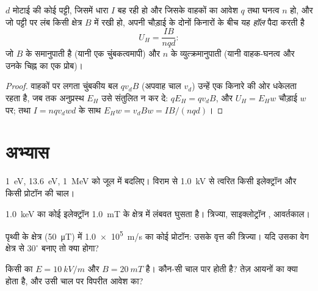 \begin{proposition}[हॉल प्रभाव]\label{prop:b1:charged-particles:hall}
$d$ मोटाई की कोई पट्टी, जिसमें धारा $I$ बह रही हो और जिसके वाहकों का आवेश
$q$ तथा घनत्व $n$ हो, और जो पट्टी पर लंब किसी क्षेत्र $B$ में रखी हो, अपनी
चौड़ाई के दोनों किनारों के बीच यह \emph{हॉल } पैदा करती है
\[
U_H = \frac{IB}{nqd} :
\]
जो $B$ के समानुपाती है (यानी एक चुंबकत्वमापी) और $n$ के व्युत्क्रमानुपाती
(यानी वाहक-घनत्व और उनके चिह्न का एक प्रोब)।
\end{proposition}

\begin{proof}
वाहकों पर लगता चुंबकीय बल $qv_dB$ (अपवाह चाल $v_d$) उन्हें एक किनारे की ओर
धकेलता रहता है, जब तक अनुप्रस्थ  $E_H$ उसे संतुलित न कर दे:
$qE_H = qv_dB$, और $U_H = E_Hw$ चौड़ाई $w$ पर; तथा $I = nqv_dwd$ के साथ
$E_Hw = v_dBw = IB/(nqd)$।
\end{proof}

\section{अभ्यास}

\begin{exercise}[$\star$]\label{exo:b1:charged-particles:1}
\qty{1}{eV}, \qty{13.6}{eV}, \qty{1}{MeV} को जूल में बदलिए। विराम से
\qty{1.0}{kV} से त्वरित किसी इलेक्ट्रॉन और किसी प्रोटॉन की चाल।
\end{exercise}

\begin{exercise}[$\star$]\label{exo:b1:charged-particles:2}
\qty{1.0}{keV} का कोई इलेक्ट्रॉन \qty{1.0}{mT} के क्षेत्र में लंबवत घुसता
है। त्रिज्या, साइक्लोट्रॉन , आवर्तकाल।
\end{exercise}

\begin{exercise}[$\star$]\label{exo:b1:charged-particles:3}
पृथ्वी के क्षेत्र (\qty{50}{\micro T}) में \qty{1.0e5}{m/s} का कोई प्रोटॉन:
उसके वृत्त की त्रिज्या। यदि उसका वेग क्षेत्र से $30^\circ$ बनाए तो क्या
होगा?
\end{exercise}

\begin{exercise}[$\star$]\label{exo:b1:charged-particles:4}
किसी  का $E = \qty{10}{kV/m}$ और $B = \qty{20}{mT}$ है। कौन-सी चाल
पार होती है? तेज़ आयनों का क्या होता है, और उसी चाल पर विपरीत आवेश का?
\end{exercise}

